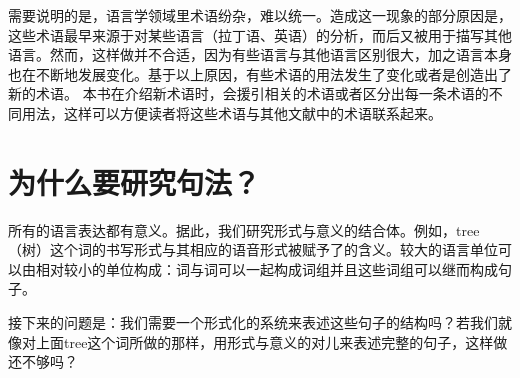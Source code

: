 \largerpage[2]
需要说明的是，语言学领域里术语纷杂，难以统一。造成这一现象的部分原因是，这些术语最早来源于对某些语言（\egc 拉丁语、英语）的分析，而后又被用于描写其他语言。然而，这样做并不合适，因为有些语言与其他语言区别很大，加之语言本身也在不断地发展变化。基于以上原因，有些术语的用法发生了变化或者是创造出了新的术语。
本书在介绍新术语时，会援引相关的术语或者区分出每一条术语的不同用法，这样可以方便读者将这些术语与其他文献中的术语联系起来。

\section{为什么要研究句法？}
\label{sec-wozu-syntax}

所有的语言表达都有意义。据此，我们研究形式与意义的结合体\citep{Saussure16a}\nocite{Saussure16a-Fr}。例如，tree（树）这个词的书写形式与其相应的语音形式被赋予了的含义。较大的语言单位可以由相对较小的单位构成：词与词可以一起构成词组并且这些词组可以继而构成句子。

接下来的问题是：我们需要一个形式化的系统来表述这些句子的结构吗？若我们就像对上面tree这个词所做的那样，用形式与意义的对儿来表述完整的句子，这样做还不够吗？

